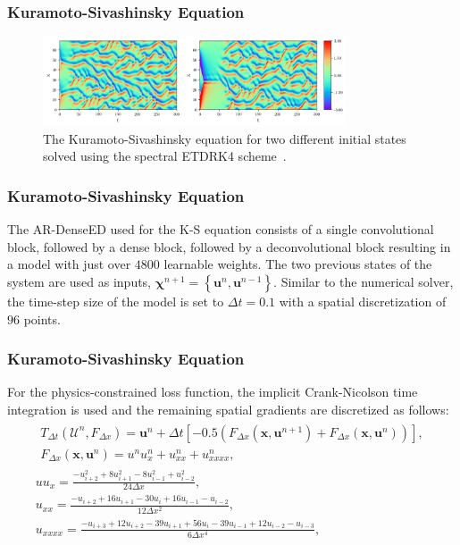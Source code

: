 \documentclass{beamer}
\theoremstyle{remark}
\begin{document}
\begin{frame}
\frametitle{Kuramoto-Sivashinsky Equation}
\begin{figure}[H]
    \centering
    \includegraphics[width=0.8\textwidth]{Fig04.png}
    \caption{The Kuramoto-Sivashinsky equation for two different initial states solved using the spectral ETDRK4 scheme~\cite{cox2002exponential}.}
    \label{fig:ks-simulation}
\end{figure}
\end{frame}

\begin{frame}
\frametitle{Kuramoto-Sivashinsky Equation}

The AR-DenseED used for the K-S equation consists of a single convolutional block, followed by a dense block, followed by a deconvolutional block resulting in a model with just over $4800$ learnable weights.
The two previous states of the system are used as inputs, $\bm{\chi}^{n+1}=\left\{\bm{u}^{n},\bm{u}^{n-1}\right\}$.
Similar to the numerical solver, the time-step size of the model is set to $\Delta t = 0.1$ with a spatial discretization of $96$ points.
\end{frame}

\begin{frame}
\frametitle{Kuramoto-Sivashinsky Equation}
For the physics-constrained loss function, the implicit Crank-Nicolson time integration is used and the remaining spatial gradients are discretized as follows:
\begin{gather}
    \begin{gathered}
    T_{\Delta t}(\bm{\mathcal{U}}^{n}, F_{\Delta x}) = \bm{u}^{n} + \Delta t \left[-0.5\left(F_{\Delta x}(\bm{x}, \bm{u}^{n+1}) + F_{\Delta x}(\bm{x}, \bm{u}^{n})\right)\right],\\ F_{\Delta x}(\bm{x}, \bm{u}^{n}) = u^{n}u^{n}_{x} + u^{n}_{xx} + u^{n}_{xxxx},\end{gathered}\\
    uu_{x} = \frac{-u^{2}_{i+2}+8u^{2}_{i+1}-8u^{2}_{i-1}+u^{2}_{i-2}}{24 \Delta x}, \\
    u_{xx} = \frac{-u_{i+2}+16u_{i+1}-30u_{i}+16u_{i-1}-u_{i-2}}{12\Delta x^{2}},\\
    u_{xxxx} = \frac{-u_{i+3}+12u_{i+2}-39u_{i+1}+56u_{i}-39u_{i-1}+12u_{i-2}-u_{i-3}}{6\Delta x^{4}},
\end{gather}
\end{frame}
\end{document}
